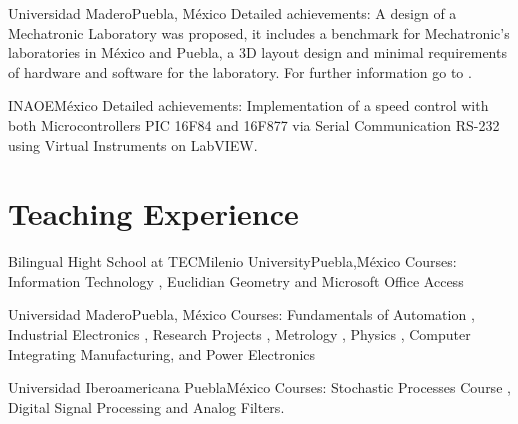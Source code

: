 \documentclass[10pt,a4paper,roman]{moderncv}
\begin{document}
{Universidad Madero}{Puebla, M\'exico}{}
{Detailed achievements: A design of a Mechatronic Laboratory was proposed, it includes a benchmark for
Mechatronic's laboratories in M\'exico and Puebla, a 3D layout design and minimal 
requirements of hardware and software for the laboratory.
For further information go to \href{https://sites.google.com/site/perezxochicaleprojects/mechatronicslaboratorydesign}{\faExternalLink}.
}

{INAOE}{M\'exico}{}
{Detailed achievements: 
Implementation of a speed control with both Microcontrollers PIC 16F84 and 16F877
via Serial Communication RS-232 using Virtual Instruments on LabVIEW.
}

\section{Teaching Experience}

{Bilingual Hight School at TECMilenio University}{Puebla,M\'exico}{}
{Courses: 
Information Technology \href{https://sites.google.com/site/perezxochicale/teaching/iit}{\faExternalLink},
Euclidian Geometry  \href{https://sites.google.com/site/perezxochicale/teaching/euclidean-geometry}{\faExternalLink}
and
Microsoft Office Access \href{https://sites.google.com/site/perezxochicale/teaching/moa}{\faExternalLink}
}

{Universidad Madero}{Puebla, M\'exico}{}
{Courses: Fundamentals of Automation 
\href{https://sites.google.com/site/perezxochicale/digital-electronics}{\faExternalLink}, 
Industrial Electronics \href{https://sites.google.com/site/perezxochicale/ie}{\faExternalLink}, 
Research Projects \href{https://sites.google.com/site/perezxochicale/latex/thesistemplate}{\faExternalLink}, 
Metrology \href{https://sites.google.com/site/perezxochicale/metrology}{\faExternalLink}, 
Physics \href{http://goo.gl/fffnG}{\faExternalLink}, 
Computer Integrating Manufacturing, and Power Electronics
}

{Universidad Iberoamericana Puebla}{M\'exico}{}
{Courses: Stochastic Processes Course 
\href{https://sites.google.com/site/perezxochicale/stochastic-processes-course}{\faExternalLink}, 
Digital Signal Processing 
\href{https://sites.google.com/site/perezxochicale/digital-signal-processing-course}{\faExternalLink}
and Analog Filters.
}
\end{document}
